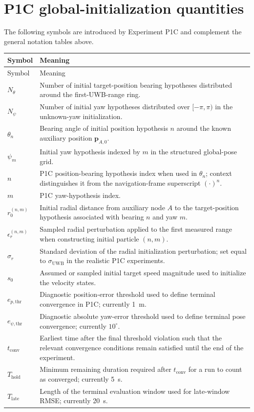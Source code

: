 \section*{P1C global-initialization quantities}
The following symbols are introduced by Experiment P1C and complement the general notation tables above.
\begin{longtable}{p{}p{}}
\toprule
Symbol & Meaning\\
\midrule
\endfirsthead
\toprule
Symbol & Meaning\\
\midrule
\endhead
$N_{\theta}$ & Number of initial target-position bearing hypotheses distributed around the first-UWB-range ring.\\
$N_{\psi}$ & Number of initial yaw hypotheses distributed over $[-\pi,\pi)$ in the unknown-yaw initialization.\\
$\theta_n$ & Bearing angle of initial position hypothesis $n$ around the known auxiliary position $\bm p_{A,0}$.\\
$\psi_m$ & Initial yaw hypothesis indexed by $m$ in the structured global-pose grid.\\
$n$ & P1C position-bearing hypothesis index when used in $\theta_n$; context distinguishes it from the navigation-frame superscript $(\cdot)^n$.\\
$m$ & P1C yaw-hypothesis index.\\
$r_0^{(n,m)}$ & Initial radial distance from auxiliary node $A$ to the target-position hypothesis associated with bearing $n$ and yaw $m$.\\
$\epsilon_r^{(n,m)}$ & Sampled radial perturbation applied to the first measured range when constructing initial particle $(n,m)$.\\
$\sigma_r$ & Standard deviation of the radial initialization perturbation; set equal to $\sigma_{\mathrm{UWB}}$ in the realistic P1C experiments.\\
$s_0$ & Assumed or sampled initial target speed magnitude used to initialize the velocity states.\\
$e_{p,\mathrm{thr}}$ & Diagnostic position-error threshold used to define terminal convergence in P1C; currently \SI{1}{m}.\\
$e_{\psi,\mathrm{thr}}$ & Diagnostic absolute yaw-error threshold used to define terminal pose convergence; currently $10^{\circ}$.\\
$t_{\mathrm{conv}}$ & Earliest time after the final threshold violation such that the relevant convergence conditions remain satisfied until the end of the experiment.\\
$T_{\mathrm{hold}}$ & Minimum remaining duration required after $t_{\mathrm{conv}}$ for a run to count as converged; currently \SI{5}{s}.\\
$T_{\mathrm{late}}$ & Length of the terminal evaluation window used for late-window RMSE; currently \SI{20}{s}.\\
\bottomrule
\end{longtable}
